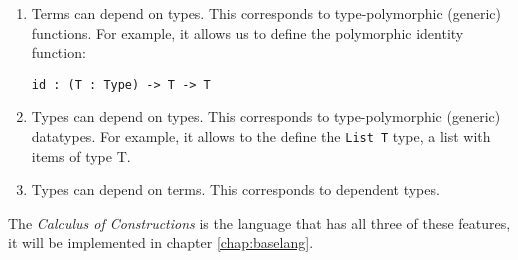 \begin{enumerate}
	\item Terms can depend on types. This corresponds to type-polymorphic (generic) functions. For example, it allows us to define the polymorphic identity function:
	\begin{lstlisting}
id : (T : Type) -> T -> T
	\end{lstlisting}
	\item Types can depend on types. This corresponds to type-polymorphic (generic) datatypes. For example, it allows to the define the \verb|List T| type, a list with items of type T.
	
	\item Types can depend on terms. This corresponds to dependent types.
\end{enumerate}

The \textit{Calculus of Constructions} is the language that has all three of these features, it will be implemented in chapter \ref{chap:baselang}.

